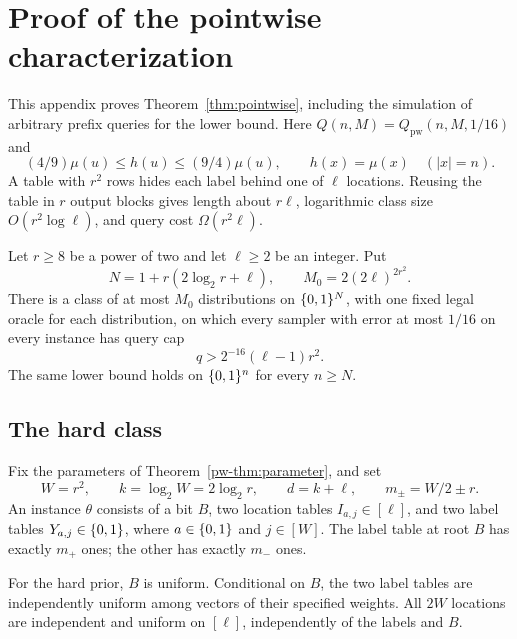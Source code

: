 \section{Proof of the pointwise characterization}\label{app:pointwise}
This appendix proves Theorem~\ref{thm:pointwise}, including the simulation of arbitrary prefix queries for the lower bound. Here $Q(n,M)=Q_{\mathrm{pw}}(n,M,1/16)$ and
\begin{equation}\label{eq:pw-model}
 (4/9)\mu(u)\le h(u)\le(9/4)\mu(u),\qquad h(x)=\mu(x)\quad(|x|=n).
\end{equation}
A table with $r^2$ rows hides each label behind one of $\ell$ locations. Reusing the table in $r$ output blocks gives length about $r\ell$, logarithmic class size $O(r^2\log\ell)$, and query cost $\Omega(r^2\ell)$.

\begin{theorem}\label{pw-thm:parameter}
Let $r\ge8$ be a power of two and let $\ell\ge2$ be an integer. Put
\[
N=1+r(2\log_2r+\ell),\qquad M_0=2(2\ell)^{2r^2}.
\]
There is a class of at most $M_0$ distributions on $\{0,1\}^N$, with one fixed legal oracle for each distribution, on which every sampler with error at most $1/16$ on every instance has query cap
\begin{equation}\label{pw-eq:parameter}
q>2^{-16}(\ell-1)r^2.
\end{equation}
The same lower bound holds on $\{0,1\}^n$ for every $n\ge N$.
\end{theorem}

\subsection{The hard class}\label{pw-sec:construction}

Fix the parameters of Theorem~\ref{pw-thm:parameter}, and set
\[
W=r^2,\qquad k=\log_2W=2\log_2r,\qquad d=k+\ell,
\qquad m_\pm=W/2\pm r.
\]
An instance $\theta$ consists of a bit $B$, two location tables
$I_{a,j}\in[\ell]$, and two label tables $Y_{a,j}\in\{0,1\}$, where $a\in\{0,1\}$ and $j\in[W]$. The label table at root $B$ has exactly $m_+$ ones; the other has exactly $m_-$ ones.

For the hard prior, $B$ is uniform. Conditional on $B$, the two label tables are independently uniform among vectors of their specified weights. All $2W$ locations are independent and uniform on $[\ell]$, independently of the labels and $B$.

